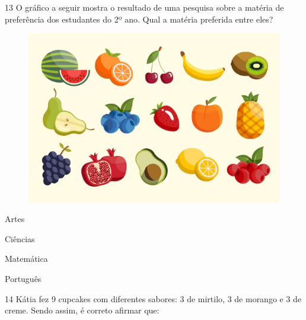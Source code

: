 \num{13} O gráfico a seguir mostra o resultado de uma pesquisa sobre a matéria de
preferência dos estudantes do 2º ano. Qual a matéria preferida entre eles?

\begin{figure}[htpb!]
\includegraphics[width=\textwidth]{./media/image149.png}
\end{figure}

\begin{minipage}{.5\textwidth}
\begin{escolha}
\item Artes

\item Ciências

\item Matemática

\item Português
\end{escolha}
\end{minipage}

\num{14} Kátia fez 9 cupcakes com diferentes sabores: 3 de mirtilo, 3 de morango
e 3 de creme. Sendo assim, é correto afirmar que:

